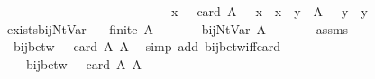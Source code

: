 \begin{isabellebody}
\ \ \ \ \ \ \ \ \ \ \ \ \ \ \ \ \ \ \ \ \ \ \ \ \ \ {\isasymand}\ {\isacharparenleft}{\kern0pt}{\isasymforall}x\ {\isasymin}\ {\isacharbraceleft}{\kern0pt}{\isachardot}{\kern0pt}{\isachardot}{\kern0pt}{\isacharless}{\kern0pt}\ card\ A{\isacharbraceright}{\kern0pt}{\isachardot}{\kern0pt}\ {\isasymgamma}{\isacharprime}{\kern0pt}\ {\isacharparenleft}{\kern0pt}{\isasymgamma}\ x{\isacharparenright}{\kern0pt}\ {\isacharequal}{\kern0pt}\ x{\isacharparenright}{\kern0pt}\ {\isasymand}\ {\isacharparenleft}{\kern0pt}{\isasymforall}y\ {\isasymin}\ A{\isachardot}{\kern0pt}\ {\isasymgamma}\ {\isacharparenleft}{\kern0pt}{\isasymgamma}{\isacharprime}{\kern0pt}\ y{\isacharparenright}{\kern0pt}\ {\isacharequal}{\kern0pt}\ y{\isacharparenright}{\kern0pt}{\isachardoublequoteclose}\isanewline
\isanewline
{}\isamarkupfalse%
\ exists{\isacharunderscore}{\kern0pt}bij{\isacharunderscore}{\kern0pt}Nt{\isacharunderscore}{\kern0pt}Var{\isacharcolon}{\kern0pt}\isanewline
\ \ \ {\isachardoublequoteopen}finite\ A{\isachardoublequoteclose}\isanewline
\ \ \ \ \ {\isachardoublequoteopen}{\isasymexists}{\isasymgamma}\ {\isasymgamma}{\isacharprime}{\kern0pt}{\isachardot}{\kern0pt}\ bij{\isacharunderscore}{\kern0pt}Nt{\isacharunderscore}{\kern0pt}Var\ A\ {\isasymgamma}\ {\isasymgamma}{\isacharprime}{\kern0pt}{\isachardoublequoteclose}\isanewline
%
\isadelimproof
%
\endisadelimproof
%
\isatagproof
{}\isamarkupfalse%
\ {\isacharminus}{\kern0pt}\isanewline
\ \ \isamarkupfalse%
\ assms\ \isamarkupfalse%
\ {\isachardoublequoteopen}{\isasymexists}{\isasymgamma}{\isachardot}{\kern0pt}\ bij{\isacharunderscore}{\kern0pt}betw\ {\isasymgamma}\ {\isacharbraceleft}{\kern0pt}{\isachardot}{\kern0pt}{\isachardot}{\kern0pt}{\isacharless}{\kern0pt}\ card\ A{\isacharbraceright}{\kern0pt}\ A{\isachardoublequoteclose}\ \isamarkupfalse%
\ {\isacharparenleft}{\kern0pt}simp\ add{\isacharcolon}{\kern0pt}\ bij{\isacharunderscore}{\kern0pt}betw{\isacharunderscore}{\kern0pt}iff{\isacharunderscore}{\kern0pt}card{\isacharparenright}{\kern0pt}\isanewline
\ \ \isamarkupfalse%
\ \isamarkupfalse%
\ {\isasymgamma}\ \ {}{\isacharcolon}{\kern0pt}\ {\isachardoublequoteopen}bij{\isacharunderscore}{\kern0pt}betw\ {\isasymgamma}\ {\isacharbraceleft}{\kern0pt}{\isachardot}{\kern0pt}{\isachardot}{\kern0pt}{\isacharless}{\kern0pt}\ card\ A{\isacharbraceright}{\kern0pt}\ A{\isachardoublequoteclose}\ \isamarkupfalse%

\end{isabellebody}
